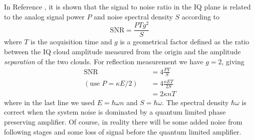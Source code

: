 In Reference \cite{Sank:demodulated_noise_stack_exchange}, it is shown that the signal to noise ratio in the IQ plane is related to the analog signal power $P$ and noise spectral density $S$ according to
\begin{equation}
  \text{SNR} = \frac{P T g^2}{S}
\end{equation}
where $T$ is the acquisition time and $g$ is a geometrical factor defined as the ratio between the IQ cloud amplitude measured from the origin and the amplitude \emph{separation} of the two clouds.
For reflection measurement we have $g=2$, giving
\begin{align}
  \text{SNR}
    &= 4 \frac{PT}{S} \\
    (\text{use } P = \kappa E/2) \quad &= 4 \frac{\kappa E T}{2S} \\
    &= 2 \kappa n T
\end{align}
where in the last line we used $E = \hbar \omega n$ and $S = \hbar \omega$.
The spectral density $\hbar \omega$ is correct when the system noise is dominated by a quantum limited phase preserving amplifier.
Of course, in reality there will be some added noise from following stages and some loss of signal before the quantum limited amplifier.
